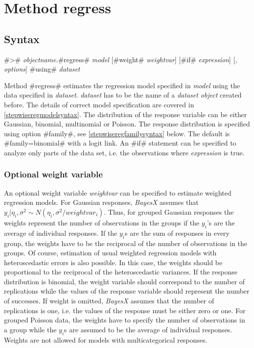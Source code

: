 \section{Method regress}
  \label{stepwiseregregress}

\subsection{Syntax}
\label{stepwiseregregresssyntax}

#># {\em objectname}.#regress# {\em model} [#weight# {\em weightvar}] [#if# {\em expression}] [{\em , options}] #using# {\em dataset}

Method #regress# estimates the regression model specified in {\em
model} using the data specified in {\em dataset}. {\em dataset} has
to be the name of a {\em dataset object} created before. The details
of correct model specification are covered in
\autoref{stepwiseregmodelsyntax}. The distribution of the response
variable can be either Gaussian, binomial, multinomial or Poisson.
The response distribution is specified using
option #family#, see \autoref{stepwiseregfamilysyntax} below. The
default is #family=binomial# with a logit link. An #if# statement
can be specified to analyze only parts of the data set, i.e. the
observations where {\em expression} is true.

\subsubsection{Optional weight variable}
\label{stepwiseregweightspecification}

An optional weight variable {\em weightvar} can be specified to
estimate weighted regression models. For Gaussian responses, {\em
BayesX} assumes that $y_i|\eta_i,\sigma^2 \sim
N(\eta_i,\sigma^2/weightvar_i)$. Thus, for grouped Gaussian
responses the weights represent the number of observations in the
groups if the $y_i$'s are the average of individual responses. If
the $y_i$s are the sum of responses in every group, the weights have
to be the reciprocal of the number of observations in the groups. Of
course, estimation of usual weighted regression models with
heteroscedastic errors is also possible. In this case, the weights
should be proportional to the reciprocal of the heteroscedastic
variances. If the response distribution is binomial, the weight
variable should correspond to the number of replications while the
values of the response variable should represent the number of
successes. If weight is omitted, {\em BayesX} assumes that the
number of replications is one, i.e. the values of the response must
be either zero or one. For grouped Poisson data, the weights have to
specify the number of observations in a group while the $y_i$s are
assumed to be the average of individual responses. Weights are not
allowed for models with multicategorical responses.

